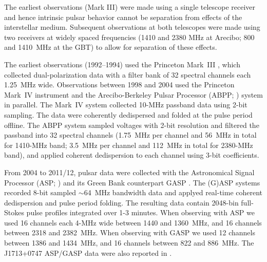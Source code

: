 The earliest observations (Mark III) were made using a single telescope
receiver and hence intrinsic pulsar behavior cannot be separation from
effects of the interstellar medium.  Subsequent observations at both
telescopes were made using two receivers at widely spaced frequencies
(1410 and 2380 MHz at Arecibo; 800 and 1410~MHz at the GBT) to allow for
separation of these effects.




The earliest observations (1992--1994) used the Princeton Mark~III
\citep{skn+92}, which collected dual-polarization data with a filter bank of 32
spectral channels each 1.25~MHz wide. 
Observations between 1998 and 2004 used the Princeton Mark~IV
\citep{sst+00} instrument and the Arecibo-Berkeley Pulsar Processor
(ABPP; \citealt{bdz+97}) system  in parallel. 
The Mark~IV system collected 10-MHz passband data using 2-bit sampling. The
data were coherently dedispersed and folded at the pulse period offline.
The ABPP system sampled voltages with 2-bit resolution and filtered the passband 
into 32 spectral channels (1.75~MHz
per channel and 56~MHz in total for 1410-MHz band; 3.5~MHz per channel and 
112~MHz in total for 2380-MHz band), and applied coherent dedispersion to each
channel using 3-bit coefficients. 




From 2004 to 2011/12, pulsar data were collected with the Astronomical Signal
Processor (ASP; \citealt{dem07}) and its Green Bank counterpart GASP \citep{dem07}.
The (G)ASP systems recorded 8-bit sampled $\sim$64~MHz bandwidth data and
applyed real-time
coherent dedispersion and pulse period folding. The resulting data contain
2048-bin full-Stokes pulse profiles integrated over 1-3 minutes. 
When observing with ASP we used 16 channels each 4-MHz wide between 1440 and
1360~MHz, and 16 channels between 2318 and 2382~MHz. 
When observing with GASP we used 12 channels between 1386 and 1434~MHz, and 16
channels between 822 and 886~MHz.
The J1713+0747 ASP/GASP data were also reported in \citet{dfg+13}.

